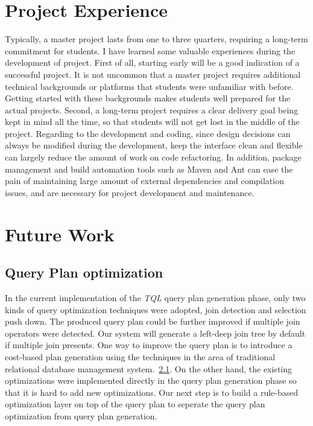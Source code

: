 \documentclass[conference, twocolumn, twoside, 11pt]{IEEEtran}
\theoremstyle{definition}
\begin{document}
\section{Project Experience}\label{proj-exp}
Typically, a master project lasts from one to three quarters, requiring a long-term commitment for students. I have learned some valuable experiences during the development of project. First of all, starting early will be a good indication of a successful project. It is not uncommon that a master project requires additional technical backgrounds or platforms that students were unfamiliar with before. Getting started with these backgrounds makes students well prepared for the actual projects. Second, a long-term project requires a clear delivery goal being kept in mind all the time, so that students will not get lost in the middle of the project. Regarding to the development and coding, since design decisions can always be modified during the development, keep the interface clean and flexible can largely reduce the amount of work on code refactoring. In addition, package management and build automation tools such as Maven and Ant can ease the pain of maintaining large amount of external dependencies and compilation issues, and are necessary for project development and maintenance.

\section{Future Work}\label{future-work}
\subsection{Query Plan optimization}
In the current implementation of the \emph{TQL} query plan generation phase, only two kinds of query optimization techniques were adopted, join detection and selection push down.
The produced query plan could be further improved if multiple join operators were detected. Our system will generate a left-deep join tree by default if multiple join presents.
One way to improve the query plan is to introduce a cost-based plan generation using the techniques in the area of traditional relational database management system.~\ref{}. On
the other hand, the existing optimizations were implemented directly in the query plan generation phase so that it is hard to add new optimizations. Our next step is to build a
rule-based optimization layer on top of the query plan to seperate the query plan optimization from query plan generation.
\end{document}
